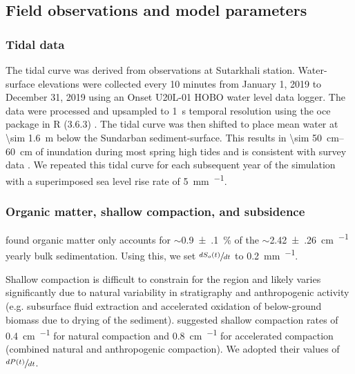 \subsection{Field observations and model parameters}

\bigskip

\subsubsection*{Tidal data}

The tidal curve was derived from observations at Sutarkhali station. Water-surface elevations were collected every 10 minutes from January 1, 2019 to December 31, 2019 using an Onset U20L-01 HOBO water level data logger. The data were processed and upsampled to \SI{1}{\second} temporal resolution using the oce package in R (3.6.3) \citep{kelleyOceAnalysisOceanographic2020}. The tidal curve was then shifted to place mean water at \SI{\sim 1.6}{\meter} below the Sundarban sediment-surface. This results in \SIrange{\sim 50}{60}{\centi\meter} of inundation during most spring high tides and is consistent with survey data \citep{auerbachFloodRiskNatural2015,haleSeasonalVariabilityForces2019,bomerSurfaceElevationSedimentation2020}. We repeated this tidal curve for each subsequent year of the simulation with a superimposed sea level rise rate of \SI{5}{\milli\meter\per\year}.

\subsubsection*{Organic matter, shallow compaction, and subsidence}

\citet{bomerProcessControlsLive2020} found organic matter only accounts for $\sim$\SI{0.9(1)}{\percent} of the $\sim$\SI{2.42(26)}{\centi\meter\per\year} yearly bulk sedimentation. Using this, we set $\sfrac{dS_o(t)}{dt}$ to \SI{0.2}{\milli\meter\per\year}.

Shallow compaction is difficult to constrain for the region and likely varies significantly due to natural variability in stratigraphy and anthropogenic activity (e.g. subsurface fluid extraction and accelerated oxidation of below-ground biomass due to drying of the sediment). \citet{auerbachFloodRiskNatural2015} suggested shallow compaction rates of \SI{0.4}{\centi\meter\per\year} for natural compaction and \SI{0.8}{\centi\meter\per\year} for accelerated compaction (combined natural and anthropogenic compaction). We adopted their values of $\sfrac{dP(t)}{dt}$.

